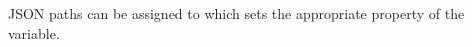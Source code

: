 \documentclass[12pt, letterpaper]{article}
\begin{document}
JSON paths can be assigned to which sets the appropriate property of the variable.

\end{document}
